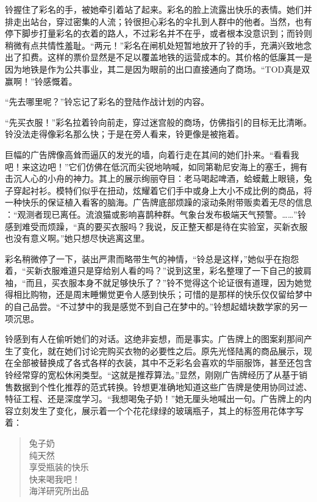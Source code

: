 铃握住了彩名的手，被她牵引着站了起来。彩名的脸上流露出快乐的表情。她们并排走出站台，穿过密集的人流；铃很担心彩名的伞扎到人群中的他者。当然，也有停下脚步打量彩名的衣着的路人，不过彩名并不在乎，或者根本没意识到；而铃则稍微有点共情性羞耻。“两元！”彩名在闸机处短暂地放开了铃的手，充满兴致地念出了扣费。这样的票价显然是不足以覆盖地铁的运营成本的。其价格的低廉其一是因为地铁是作为公共事业，其二是因为眼前的出口直接通向了商场。“TOD真是双赢啊！”铃感慨着。

“先去哪里呢？”铃忘记了彩名的登陆作战计划的内容。

“先买衣服！”彩名拉着铃向前走，穿过迷宫般的商场，仿佛指引的目标无比清晰。铃没法走得像彩名那么快；于是在旁人看来，铃更像是被拖着。

巨幅的广告牌像高耸而逼仄的发光的墙，向着行走在其间的她们扑来。“看看我吧！来这边吧！”它们仿佛在低沉而尖锐地呐喊，如同第勒尼安海上的塞壬，拥有击沉人心的小舟的神力。其上的展示绚丽夺目：老马喝起啤酒，蛤蟆戴上眼镜，兔子穿起衬衫。模特们似乎在扭动，炫耀着它们手中或身上大小不成比例的商品，将一种快乐的保证植入看客的脑海。广告牌底部烦躁的滚动条附带贩卖着无尽的信息 ：“观测者现已离任。流浪猫或影响喜鹊种群。气象台发布极端天气预警。……”铃感到难受而烦躁，“真的要买衣服吗？我说，反正整天都是待在实验室，买新衣服也没有意义啊。”她只想尽快逃离这里。

彩名稍微停了一下，装出严肃而略带生气的神情，“铃总是这样，”她似乎在抱怨着，“买新衣服难道只是穿给别人看的吗？”说到这里，彩名整理了一下自己的披肩袖，“而且，买衣服本身不就足够快乐了？”铃不觉得这个论证很有道理，因为她觉得相比购物，还是周末睡懒觉更令人感到快乐；可惜的是那样的快乐仅仅留给梦中的自己品尝。“不过梦中的我是感觉不到自己在梦中的。”铃想起蜡块数学家的另一项沉思。

铃感到有人在偷听她们的对话。这绝非妄想，而是事实。广告牌上的图案刹那间产生了变化，就在她们讨论完购买衣物的必要性之后。原先光怪陆离的商品展示，现在全部被替换成了各式各样的衣装，其中不乏彩名会喜欢的华丽服饰，甚至还包含铃经常穿的宽松休闲类型。“这就是推荐算法。”显然，刚刚广告牌经历了从基于销售数据到个性化推荐的范式转换。铃想更准确地知道这些广告牌是使用协同过滤、特征工程、还是深度学习。“我想喝兔子奶！”她无厘头地喊出一句。广告牌上的内容立刻发生了变化，展示着一个个花花绿绿的玻璃瓶子，其上的标签用花体字写着：
\begin{quote}
兔子奶\\
\fullpercent 纯天然\\
享受瓶装的快乐\\
快来喝我吧！\\
海洋研究所出品
\end{quote}

